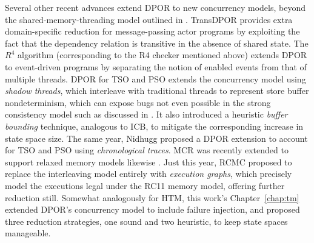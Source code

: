 Several other recent advances extend DPOR to new concurrency models,
beyond the shared-memory-threading model outlined in \sect{\ref{sec:landslide-dpor}}.
TransDPOR \cite{transdpor} provides extra domain-specific reduction for message-passing actor programs
by exploiting the fact that the dependency relation is transitive in the absence of shared state.
The $R^4$ algorithm \cite{r4} (corresponding to the R4 checker mentioned above)
extends DPOR to event-driven programs by separating the notion of enabled events from that of multiple threads.
DPOR for TSO and PSO \cite{tsopso}
extends the concurrency model
using {\em shadow threads}, which interleave with traditional threads to represent store buffer nondeterminism,
which can expose bugs not even possible in the strong consistency model
such as discussed in \sect{\ref{sec:tm-warpzone-relaxed}}.
It also introduced a heuristic {\em buffer bounding} technique, analogous to ICB,
to mitigate the corresponding increase in state space size.
The same year, Nidhugg \cite{nidhugg} proposed a DPOR extension to account for TSO and PSO
using {\em chronological traces}.
MCR was recently extended to support relaxed memory models likewise \cite{mcr-tsopso}.
Just this year, RCMC \cite{rcmc} proposed to replace the interleaving model entirely with {\em execution graphs},
which precisely model the executions legal under the RC11 memory model,
offering further reduction still.
Somewhat analogously for HTM, this work's Chapter~\ref{chap:tm}
extended DPOR's concurrency model to include failure injection,
and proposed three reduction strategies, one sound and two heuristic,
to keep state spaces manageable.

